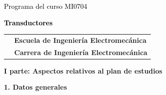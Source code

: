 \documentclass[letterpaper]{article}%
\begin{document}
%
\normalsize%
\thispagestyle{empty}%
%
\vspace*{100mm}%
\par\fontsize{14}{0}\selectfont \textcolor{black}{Programa del curso MI0704}%
\par\fontsize{18}{25}\selectfont \textbf{\textcolor{black}{Transductores}}%
\vspace*{15mm}%
\newline%
\begin{tabularx}{\textwidth}{m{}m{}}%
&\hspace*{0mm}\fontsize{12}{0}\selectfont \textbf{\textcolor{gris}{Escuela de Ingeniería Electromecánica}}\\%
[-12pt]%
&\hspace*{0mm}\fontsize{12}{0}\selectfont \textbf{\textcolor{gris}{Carrera de Ingeniería Electromecánica}}\\%
\end{tabularx}%
\newpage%
\pagestyle{headfoot}%
\par\fontsize{14}{0}\selectfont \textbf{\textcolor{parte}{I parte: Aspectos relativos al plan de estudios}}%
\par\hspace*{2mm}\fontsize{12}{14}\selectfont \textbf{\textcolor{parte}{1. Datos generales}}%
\vspace*{3mm}%
\newline%
\fontsize{10}{12}\selectfont %
\end{document}
